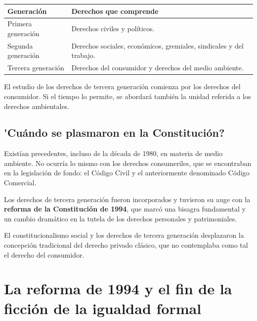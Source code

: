 \documentclass[12pt,oneside]{book}
\begin{document}
\begin{center}
{\small\renewcommand{\arraystretch}{1.25}
\begin{tabularx}{\textwidth}{@{}B{0.30\textwidth} Y@{}}
\toprule
\textbf{Generaci\'on} & \textbf{Derechos que comprende} \\
\midrule
Primera generaci\'on & Derechos civiles y pol\'iticos. \\
Segunda generaci\'on & Derechos sociales, econ\'omicos, gremiales, sindicales y del trabajo. \\
Tercera generaci\'on & Derechos del consumidor y derechos del medio ambiente. \\
\bottomrule
\end{tabularx}}
\end{center}

El estudio de los derechos de tercera generaci\'on comienza por los derechos del consumidor. Si el tiempo lo permite, se abordar\'a tambi\'en la unidad referida a los derechos ambientales.

\subsection{\texorpdfstring{\'{}Cu\'ando se plasmaron en la Constituci\'on?}{Cuando se plasmaron en la Constitucion?}}

Exist\'ian precedentes, incluso de la d\'ecada de 1980, en materia de medio ambiente.%
{} No ocurr\'ia lo mismo con los derechos consumeriles, que se encontraban en la legislaci\'on de fondo: el C\'odigo Civil y el anteriormente denominado C\'odigo Comercial.

Los derechos de tercera generaci\'on fueron incorporados y tuvieron su auge con la \textbf{reforma de la Constituci\'on de 1994}, que marc\'o una bisagra fundamental y un cambio dram\'atico en la tutela de los derechos personales y patrimoniales.

El constitucionalismo social y los derechos de tercera generaci\'on desplazaron la concepci\'on tradicional del derecho privado cl\'asico, que no contemplaba como tal el derecho del consumidor.%

\section{La reforma de 1994 y el fin de la ficci\'on de la igualdad formal}
\end{document}
